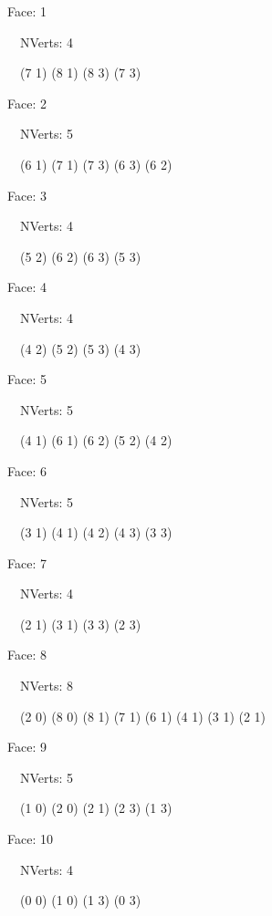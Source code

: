 \documentclass{article}
\begin{document}
{\footnotesize 

Face: 1

\   \    NVerts: 4

 \   \   (7 1) (8 1) (8 3) (7 3)}

{\footnotesize 

Face: 2

\   \    NVerts: 5

 \   \   (6 1) (7 1) (7 3) (6 3) (6 2)}

{\footnotesize 

Face: 3

\   \    NVerts: 4

 \   \   (5 2) (6 2) (6 3) (5 3)}

{\footnotesize 

Face: 4

\   \    NVerts: 4

 \   \   (4 2) (5 2) (5 3) (4 3)}

{\footnotesize 

Face: 5

\   \    NVerts: 5

 \   \   (4 1) (6 1) (6 2) (5 2) (4 2)}

{\footnotesize 

Face: 6

\   \    NVerts: 5

 \   \   (3 1) (4 1) (4 2) (4 3) (3 3)}

{\footnotesize 

Face: 7

\   \    NVerts: 4

 \   \   (2 1) (3 1) (3 3) (2 3)}

{\footnotesize 

Face: 8

\   \    NVerts: 8

 \   \   (2 0) (8 0) (8 1) (7 1) (6 1) (4 1) (3 1) (2 1)}

{\footnotesize 

Face: 9

\   \    NVerts: 5

 \   \   (1 0) (2 0) (2 1) (2 3) (1 3)}

{\footnotesize 

Face: 10

\   \    NVerts: 4

 \   \   (0 0) (1 0) (1 3) (0 3)}


 \newpage
\end{document}
